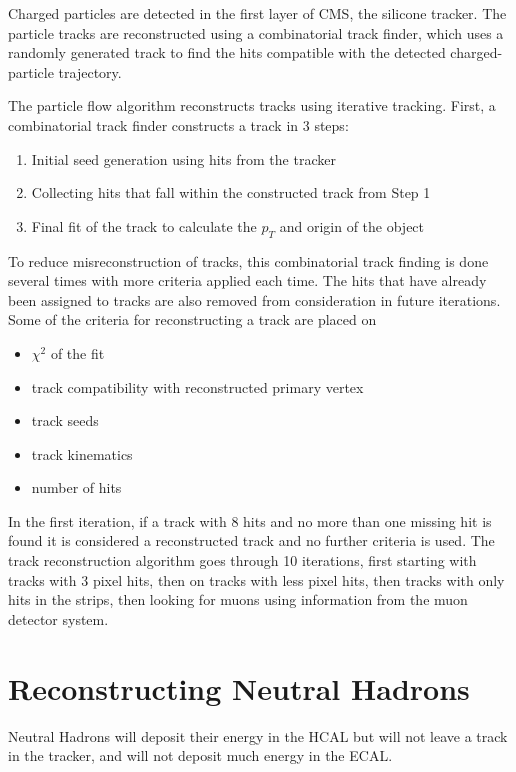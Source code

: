 Charged particles are detected in the first layer of CMS, the silicone tracker. The particle tracks are reconstructed using a combinatorial track finder, which uses a randomly generated track to find the hits compatible with the detected charged-particle trajectory. 


The particle flow algorithm reconstructs tracks using iterative tracking. First, a combinatorial track finder constructs a track in 3 steps:

\begin{enumerate}
	\item Initial seed generation using hits from the tracker
	\item Collecting hits that fall within the constructed track from Step 1
	\item Final fit of the track to calculate the $p_T$ and origin of the object
\end{enumerate}




To reduce misreconstruction of tracks, this combinatorial track finding is done several times with more criteria applied each time. The hits that have already been assigned to tracks are also removed from consideration in future iterations. Some of the criteria for reconstructing a track are placed on 


\begin{itemize}
	\item $\chi^2$ of the fit
	\item track compatibility with reconstructed primary vertex
	\item track seeds
	\item track kinematics
	\item number of hits
\end{itemize}

In the first iteration, if a track with 8 hits and no more than one missing hit is found it is considered a reconstructed track and no further criteria is used. The track reconstruction algorithm goes through 10 iterations, first starting with tracks with 3 pixel hits, then on tracks with less pixel hits, then tracks with only hits in the strips, then looking for muons using information from the muon detector system.


\section{Reconstructing Neutral Hadrons}

Neutral Hadrons will deposit their energy in the HCAL but will not leave a track in the tracker, and will not deposit much energy in the ECAL.




